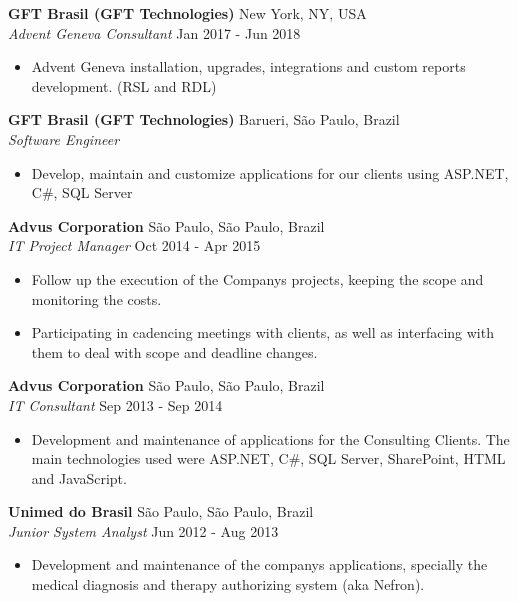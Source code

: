 \documentclass[a4paper]{article}
\begin{document}
\textbf{GFT Brasil (GFT Technologies)} \hfill New York, NY, USA\\
\textit{Advent Geneva Consultant} \hfill Jan 2017 - Jun 2018\\
\vspace{-1mm}
\begin{itemize} \itemsep 1pt
	\item Advent Geneva installation, upgrades, integrations and custom reports development. (RSL and RDL)
\end{itemize}
\textbf{GFT Brasil (GFT Technologies)} \hfill Barueri, São Paulo, Brazil\\
\textit{Software Engineer}\\
\vspace{-1mm}
\begin{itemize} \itemsep 1pt
	\item Develop, maintain and customize applications for our clients using ASP.NET, C\#, SQL Server
\end{itemize}
\textbf{Advus Corporation} \hfill São Paulo, São Paulo, Brazil\\
\textit{IT Project Manager} \hfill Oct 2014 - Apr 2015\\
\vspace{-1mm}
\begin{itemize} \itemsep 1pt
	\item Follow up the execution of the Company\textquotesingle{}s projects, keeping the scope and monitoring the costs.
	\item Participating in cadencing meetings with clients, as well as interfacing with them to deal with scope and deadline changes.
\end{itemize}
\textbf{Advus Corporation} \hfill São Paulo, São Paulo, Brazil\\
\textit{IT Consultant} \hfill Sep 2013 - Sep 2014\\
\vspace{-1mm}
\begin{itemize} \itemsep 1pt
	\item Development and maintenance of applications for the Consulting Clients. The main technologies used were ASP.NET, C\#, SQL Server, SharePoint, HTML and JavaScript.
\end{itemize}
\textbf{Unimed do Brasil} \hfill São Paulo, São Paulo, Brazil\\
\textit{Junior System Analyst} \hfill Jun 2012 - Aug 2013\\
\vspace{-1mm}
\begin{itemize} \itemsep 1pt
	\item Development and maintenance of the company\textquotesingle{}s applications, specially the medical diagnosis and therapy authorizing system (aka Nefron).
\end{itemize}
\end{document}
